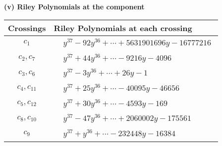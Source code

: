 \documentclass[1p]{elsarticle_modified}
\theoremstyle{definition}
\begin{document}
\flushleft \textbf{(v) Riley Polynomials at the component}\newline \\
\begin{tabular}{m{50pt}|m{274pt}}
Crossings & \hspace{64pt}Riley Polynomials at each crossing \\
\hline $$\begin{aligned}c_{1}\end{aligned}$$&$\begin{aligned}
&y^{37}-92 y^{36}+\cdots+5631901696 y-16777216
\end{aligned}$\\
\hline $$\begin{aligned}c_{2},c_{7}\end{aligned}$$&$\begin{aligned}
&y^{37}+44 y^{36}+\cdots-9216 y-4096
\end{aligned}$\\
\hline $$\begin{aligned}c_{3},c_{6}\end{aligned}$$&$\begin{aligned}
&y^{37}-3 y^{36}+\cdots+26 y-1
\end{aligned}$\\
\hline $$\begin{aligned}c_{4},c_{11}\end{aligned}$$&$\begin{aligned}
&y^{37}+25 y^{36}+\cdots-40095 y-46656
\end{aligned}$\\
\hline $$\begin{aligned}c_{5},c_{12}\end{aligned}$$&$\begin{aligned}
&y^{37}+30 y^{36}+\cdots-4593 y-169
\end{aligned}$\\
\hline $$\begin{aligned}c_{8},c_{10}\end{aligned}$$&$\begin{aligned}
&y^{37}-47 y^{36}+\cdots+2060002 y-175561
\end{aligned}$\\
\hline $$\begin{aligned}c_{9}\end{aligned}$$&$\begin{aligned}
&y^{37}+y^{36}+\cdots-232448 y-16384
\end{aligned}$\\
\hline
\end{tabular}\\~\\
\end{document}
